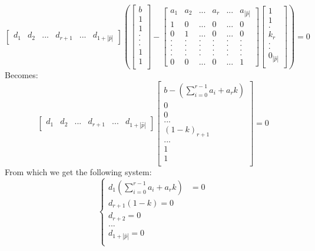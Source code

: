 \documentclass[1pt]{article}
\begin{document}
	\[\begin{bmatrix}
	d_1 & d_2 & ... & d_{r+1} & ... & d_{1+|\hat{p}|}
	\end{bmatrix}
	\left(\begin{bmatrix}
	b\\
	1\\
	1\\
	.\\
	.\\
	.\\
	1\\
	1\\
	\end{bmatrix}%
	-
	\begin{bmatrix}
	a_1 & a_2 & ... & a_r & ... & a_{|\hat{p}|}\\
	1   &  0  & ... & 0   & ... & 0\\
	0   &  1  & ... & 0   & ... & 0\\
	.   &  .  & . & .  & . & .\\
	.   &  .  & . & .  & . & .\\
	.   &  .  & . & .  & . & .\\
	.   &  .  & . & .  & . & .\\
	0   &  0  & ... & 0   & ... & 1
	\end{bmatrix}
	\begin{bmatrix}
	1\\
	1\\
	.\\
	k_r\\
	.\\
	.\\
	0_{|\hat{p}|}\\
	\end{bmatrix}\right)%
	 = 
	0
	\]
	Becomes:
	\[\begin{bmatrix}
	d_1 & d_2 & ... & d_{r+1} & ... & d_{1+|\hat{p}|}
	\end{bmatrix}
	\begin{bmatrix}
	b - (\sum_{i=0}^{r-1} a_i + a_rk)\\
	0\\
	0\\
	...\\
	(1-k)_{r+1}\\
	...\\
	1\\
	1\\
	\end{bmatrix}%
	 = 
	0
	\]
	From which we get the following system:\\
	\[ \left\{\begin{aligned}
		d_1(\sum_{i=0}^{r-1} a_i + a_rk) & = 0 \\
		d_{r+1}(1-k) = 0\\
		d_{r+2} = 0\\
		...\\
		d_{1+|\hat{p}|} = 0\\
		\end{aligned}	\right.
	 \]%
\end{document}
